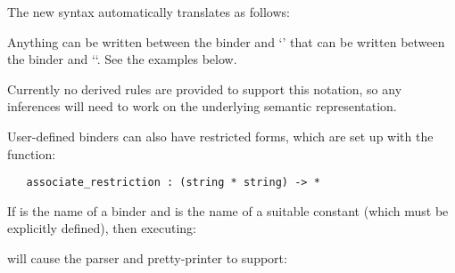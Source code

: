 The new syntax automatically translates as follows:

\begin{hol}
{\small\verb%   \%}$v${\small\verb%::%}$P${\small\verb%.%}$B${\small\verb%    <---->   RES_ABSTRACT %}$P${\small\verb% (\%}$v${\small\verb%.%}$B${\small\verb%)%}\\
{\small\verb%   !%}$v${\small\verb%::%}$P${\small\verb%.%}$B${\small\verb%    <---->   RES_FORALL   %}$P${\small\verb% (\%}$v${\small\verb%.%}$B${\small\verb%)%}\\
{\small\verb%   ?%}$v${\small\verb%::%}$P${\small\verb%.%}$B${\small\verb%    <---->   RES_EXISTS   %}$P${\small\verb% (\%}$v${\small\verb%.%}$B${\small\verb%)%}\\
{\small\verb%   @%}$v${\small\verb%::%}$P${\small\verb%.%}$B${\small\verb%    <---->   RES_SELECT   %}$P${\small\verb% (\%}$v${\small\verb%.%}$B${\small\verb%)%}
\end{hol}

Anything can be written between the binder and `\ml{::}' that can be
written between the binder and ``. See the examples below.

Currently no derived rules are provided to support this notation, so
any inferences will need to work on the underlying semantic
representation.

User-defined binders can also have restricted forms, which are set up
with the function:

\begin{boxed}
\begin{verbatim}
   associate_restriction : (string * string) -> *
\end{verbatim}\end{boxed}


\noindent If  is the name
of a binder and  is the name of a suitable constant (which
must be explicitly defined), then executing:

\begin{hol}
{\small\verb%   associate_restriction(`%}$c${\small\verb%`, `RES_%}$c${\small\verb%`)%}
\end{hol}

\noindent will cause the parser and pretty-printer to support:

\begin{hol}
{\small\verb%   %}$c$ $v${\small\verb%::%}$P${\small\verb%. %}$B${\small\verb%    <---->   RES_%}$c$ $P${\small\verb% (\%}$v${\small\verb%. %}$B${\small\verb%)%}
\end{hol}

